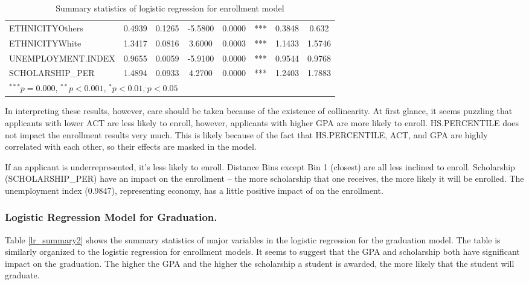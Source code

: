 \documentclass[12pt,english]{report}
\begin{document}
\begin{table}[H]
\begin{adjustbox}{width=0.95\textwidth}
\begin{tabular}{|lccclccc|}
ETHNICITYOthers                & 0.4939   & 0.1265     & -5.5800  & 0.0000    & ***         & 0.3848 & 0.632   \\
ETHNICITYWhite                  & 1.3417   & 0.0816     & 3.6000   & 0.0003    & ***         & 1.1433 & 1.5746  \\
UNEMPLOYMENT.INDEX              & 0.9655   & 0.0059     & -5.9100  & 0.0000    & ***         & 0.9544 & 0.9768  \\
SCHOLARSHIP\_PER                & 1.4894   & 0.0933     & 4.2700   & 0.0000    & ***         & 1.2403 & 1.7883  \\
\hline \hline
\multicolumn{7}{l}{\scriptsize{$^{***} p=0.000$, $^{**} p<0.001$, $^*p<0.01$,$^{.}p<0.05$}}
\end{tabular}
\end{adjustbox}
\caption{Summary statistics of logistic regression for enrollment model}
\label{lr_summary}
\end{table}

In interpreting these results, however, care should be taken because of the existence of collinearity. At first glance, it seems puzzling that  applicants with lower ACT are less likely to enroll, however, applicants with higher GPA are more likely to enroll. HS.PERCENTILE does not impact the  enrollment results very much. This is likely because of the fact that HS.PERCENTILE, ACT, and GPA are highly correlated with each other, so their effects are masked in the model. 

If an applicant is underrepresented, it's less likely to enroll. Distance Bins except Bin 1 (closest) are all less inclined to  enroll. Scholarship (SCHOLARSHIP\_PER) have an impact on the  enrollment -- the more scholarship that one receives, the more likely it will be enrolled.  The unemployment index (0.9847), representing economy, has a little positive impact of on the enrollment.
  
\subsubsection{Logistic Regression Model for Graduation.}  
Table \ref{lr_summary2} shows the summary statistics of major variables in the logistic regression for the graduation model. The table is similarly organized to the logistic regression for enrollment models.  It seems to suggest that the GPA and scholarship both have significant impact on the graduation. The higher the GPA and the higher the scholarship a student is awarded, the more likely that the student will graduate. 
\end{document}
